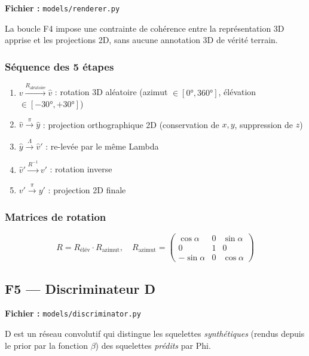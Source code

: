 \documentclass[12pt,a4paper]{article}
\begin{document}
\textbf{Fichier :} \texttt{models/renderer.py}

La boucle F4 impose une contrainte de cohérence entre la représentation 3D apprise
et les projections 2D, sans aucune annotation 3D de vérité terrain.

\subsubsection*{Séquence des 5 étapes}

\begin{enumerate}
  \item $v \xrightarrow{R_{\text{aléatoire}}} \hat{v}$ : rotation 3D aléatoire
        (azimut $\in [0°, 360°]$, élévation $\in [-30°, +30°]$)
  \item $\hat{v} \xrightarrow{\pi} \hat{y}$ : projection orthographique 2D
        (conservation de $x,y$, suppression de $z$)
  \item $\hat{y} \xrightarrow{\Lambda} \hat{v}'$ : re-levée par le même Lambda
  \item $\hat{v}' \xrightarrow{R^{-1}} v'$ : rotation inverse
  \item $v' \xrightarrow{\pi} y'$ : projection 2D finale
\end{enumerate}

\subsubsection*{Matrices de rotation}

\begin{equation}
  R = R_{\text{élév}} \cdot R_{\text{azimut}}, \quad
  R_{\text{azimut}} = \begin{pmatrix} \cos\alpha & 0 & \sin\alpha \\ 0 & 1 & 0 \\ -\sin\alpha & 0 & \cos\alpha \end{pmatrix}
\end{equation}

\subsection{F5 --- Discriminateur D}
\label{sec:disc}

\textbf{Fichier :} \texttt{models/discriminator.py}

D est un réseau convolutif qui distingue les squelettes \emph{synthétiques} (rendus
depuis le prior par la fonction $\beta$) des squelettes \emph{prédits} par Phi.
\end{document}
